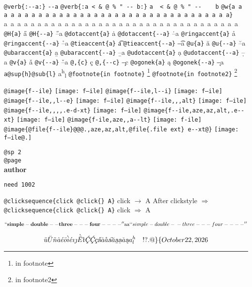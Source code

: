 \documentclass{book}
\renewcommand{\includegraphics}[1]{\fbox{FIG #1}}
\begin{document}
\begin{titlepage}
\texttt{@verb\{:{-}{-}a:\}} \verb:--a:
\texttt{@verb\{:a  < \& @ \% " {-}{-}    b:\}} \verb:a  < & @ % " --    b:
\texttt{@w\{a a a a a a a a a a a a a a a a a a a a a a a a a a a a a a a a a a a\}} \hbox{a a a a a a a a a a a a a a a a a a a a a a a a a a a a a a a a a a a}
\texttt{@H\{a\}} \H{a}
\texttt{@H\{{-}{-}a\}} \H{--a}
\texttt{@dotaccent\{a\}} \.{a}
\texttt{@dotaccent\{{-}{-}a\}} \.{--a}
\texttt{@ringaccent\{a\}} \r{a}
\texttt{@ringaccent\{{-}{-}a\}} \r{--a}
\texttt{@tieaccent\{a\}} \t{a}
\texttt{@tieaccent\{{-}{-}a\}} \t{--a}
\texttt{@u\{a\}} \u{a}
\texttt{@u\{{-}{-}a\}} \u{--a}
\texttt{@ubaraccent\{a\}} \b{a}
\texttt{@ubaraccent\{{-}{-}a\}} \b{--a}
\texttt{@udotaccent\{a\}} \d{a}
\texttt{@udotaccent\{{-}{-}a\}} \d{--a}
\texttt{@v\{a\}} \v{a}
\texttt{@v\{{-}{-}a\}} \v{--a}
\texttt{@,\{c\}} \c{c}
\texttt{@,\{{-}{-}c\}} \c{--c}
\texttt{@ogonek\{a\}} \k{a}
\texttt{@ogonek\{{-}{-}a\}} \k{--a}
\texttt{a@sup\{h\}@sub\{l\}} a\textsuperscript{h}\textsubscript{l}
\texttt{@footnote\{in footnote\}} \footnote{in footnote}
\texttt{@footnote\{in footnote2\}} \footnote{in footnote2}

\texttt{@image\{f{-}{-}ile\}} \texttt{[image: f--ile]}
\texttt{@image\{f{-}{-}ile,l{-}{-}i\}} \texttt{[image: f--ile]}
\texttt{@image\{f{-}{-}ile,,l{-}{-}e\}} \texttt{[image: f--ile]}
\texttt{@image\{f{-}{-}ile,,,alt\}} \texttt{[image: f--ile]}
\texttt{@image\{f{-}{-}ile,,,,.e-d-xt\}} \texttt{[image: f--ile]}
\texttt{@image\{f{-}{-}ile,aze,az,alt,.e{-}{-}xt\}} \texttt{[image: f--ile]}
\texttt{@image\{f-ile,aze,,a{-}{-}lt\}} \texttt{[image: f-ile]}
\texttt{@image\{@file\{f{-}{-}ile\}@@@.,aze,az,alt,@file\{.file ext\} e{-}{-}xt@\}} \texttt{[image: f--ile@.]}

\texttt{@sp 2}\leavevmode{}\\
\baselineskip %
\texttt{@page}\leavevmode{}\\
\newpage{}%
\phantom{blabla}%
{\bfseries author}%

\texttt{need 1002}
\needspace{1.002pt}%

\texttt{@clicksequence\{click @click\{\} A\}} click $\rightarrow{}$ A
After clickstyle $\Rightarrow{}$
\texttt{@clicksequence\{click @click\{\} A\}} click $\Rightarrow{}$ A

$$
\mathbf{``simple-double--three---four----''} \hbox{aa}
`\hbox{}`simple-double-\hbox{}-three---four----'\hbox{}'
$$

$$
\ddot{u} \ddot{U} \tilde{n} \hat{a} \acute{e} \bar{o} \grave{i} \acute{e} \imath{} \jmath{} \grave{\bar{E}}
\mathord{\text{\l{}}} \textsl{\c{\'{C}}} \textsl{\c{\'{C}}} \textsl{\c{c}} \textsl{\H{a}} \dot{a} \mathring{a} \textsl{\t{a}}
\breve{a} \textsl{\b{a}} \textsl{\d{a}} \check{a} \textsl{\k{a}} a^{h}_{l}
 \ {}\ {} \ {}\-{}   ! ? . @ \} \{ 
\today{}
$$


\end{titlepage}
\end{document}
